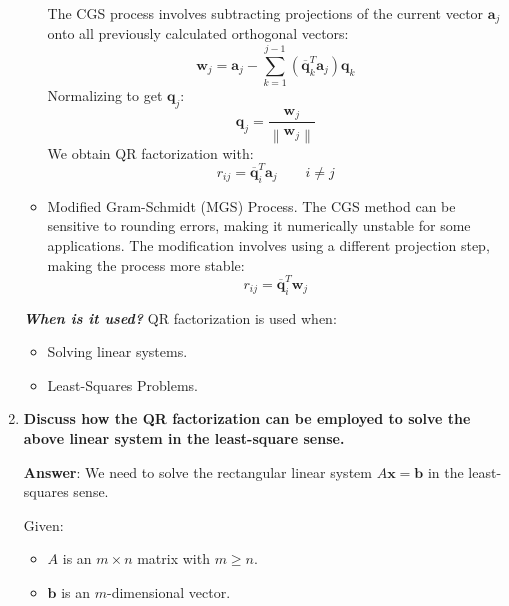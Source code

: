 \begin{enumerate}[label=\textcolor{Green3}{\textbf{\arabic*.}}]
\begin{itemize}
        The CGS process involves subtracting projections of the current vector $\mathbf{a}_{j}$ onto all previously calculated orthogonal vectors:
        \begin{equation*}
            \mathbf{w}_{j} = \mathbf{a}_{j} - \displaystyle\sum_{k=1}^{j-1}\left(\overline{\mathbf{q}}_{k}^{T}\mathbf{a}_{j}\right)\mathbf{q}_{k}
        \end{equation*}
        Normalizing to get $\mathbf{q}_{j}$:
        \begin{equation*}
            \mathbf{q}_{j} = \dfrac{\mathbf{w}_{j}}{\left\|\mathbf{w}_{j}\right\|}
        \end{equation*}
        We obtain QR factorization with:
        \begin{equation*}
            r_{ij} = \overline{\mathbf{q}}_{i}^{T} \mathbf{a}_{j} \hspace{2em} i \ne j
        \end{equation*}

        \item Modified Gram-Schmidt (MGS) Process. The CGS method can be sensitive to rounding errors, making it numerically unstable for some applications. The modification involves using a different projection step, making the process more stable:
        \begin{equation*}
            r_{ij} = \overline{\mathbf{q}}_{i}^{T} \mathbf{w}_{j}
        \end{equation*}
    \end{itemize}
    
    \textbf{\emph{When is it used?}} QR factorization is used when:
    \begin{itemize}
        \item Solving linear systems.
        \item Least-Squares Problems.
    \end{itemize}


    \newpage

    \item \textcolor{Green3}{\textbf{%
        Discuss how the QR factorization can be employed to solve the above linear system in the least-square sense.
    }}

    \textbf{Answer}: We need to solve the rectangular linear system $A\mathbf{x} = \mathbf{b}$ in the least-squares sense.

    Given:
    \begin{itemize}
        \item $A$ is an $m \times n$ matrix with $m \ge n$.
        \item $\mathbf{b}$ is an $m$-dimensional vector.
    \end{itemize}
    

\end{enumerate}
